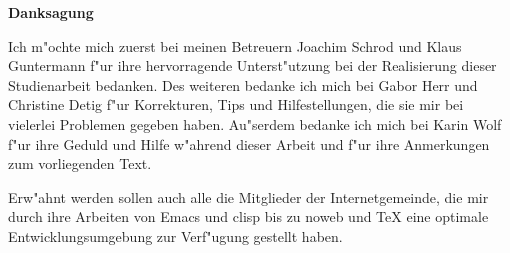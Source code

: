 
\thispagestyle{empty}

\mbox{}
\vfill

\noindent\textbf{Danksagung}

\bigskip

\noindent Ich m"ochte mich zuerst bei meinen Betreuern Joachim Schrod
und Klaus Guntermann f"ur ihre hervorragende Unterst"utzung bei der
Realisierung dieser Studienarbeit bedanken. Des weiteren bedanke ich
mich bei Gabor Herr und Christine Detig f"ur Korrekturen, Tips und
Hilfestellungen, die sie mir bei vielerlei Problemen gegeben haben.
Au"serdem bedanke ich mich bei Karin Wolf f"ur ihre Geduld und Hilfe
w"ahrend dieser Arbeit und f"ur ihre Anmerkungen zum vorliegenden
Text.

\bigskip\noindent Erw"ahnt werden sollen auch alle die Mitglieder der
Internetgemeinde, die mir durch ihre Arbeiten von \textsf{Emacs} und
\textsf{clisp} bis zu \textsf{noweb} und \TeX{} eine optimale
Entwicklungsumgebung zur Verf"ugung gestellt haben.


